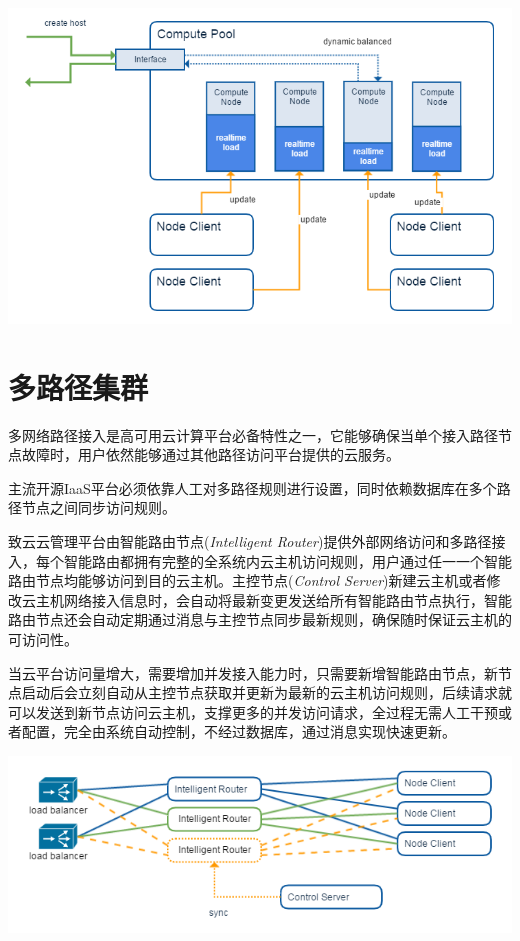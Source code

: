 \documentclass[letterpaper,10pt]{sphinxmanual}
\begin{document}
\includegraphics{4_1_dynamic_balanced.png}


\section{多路径集群}
\label{index:id19}
多网络路径接入是高可用云计算平台必备特性之一，它能够确保当单个接入路径节点故障时，用户依然能够通过其他路径访问平台提供的云服务。

主流开源IaaS平台必须依靠人工对多路径规则进行设置，同时依赖数据库在多个路径节点之间同步访问规则。

致云云管理平台由智能路由节点(\emph{Intelligent Router})提供外部网络访问和多路径接入，每个智能路由都拥有完整的全系统内云主机访问规则，用户通过任一一个智能路由节点均能够访问到目的云主机。主控节点(\emph{Control Server})新建云主机或者修改云主机网络接入信息时，会自动将最新变更发送给所有智能路由节点执行，智能路由节点还会自动定期通过消息与主控节点同步最新规则，确保随时保证云主机的可访问性。

当云平台访问量增大，需要增加并发接入能力时，只需要新增智能路由节点，新节点启动后会立刻自动从主控节点获取并更新为最新的云主机访问规则，后续请求就可以发送到新节点访问云主机，支撑更多的并发访问请求，全过程无需人工干预或者配置，完全由系统自动控制，不经过数据库，通过消息实现快速更新。

\includegraphics{4_2_multipath.png}
\end{document}
